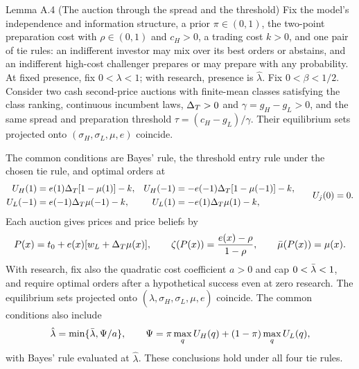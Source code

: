 \begin{paperresult}{Lemma A.4 (The auction through the spread and the threshold)}
Fix the model's independence and information structure, a prior \(\pi\in(0,1)\), the two-point preparation cost
with \(\rho\in(0,1)\) and \(c_H>0\), a trading cost \(k>0\), and one pair of tie rules: an indifferent investor may
mix over its best orders or abstains, and an indifferent high-cost challenger prepares or may prepare with any
probability. At fixed presence, fix \(0<\lambda<1\); with research, presence is \(\hat\lambda\). Fix
\(0<\beta<1/2\). Consider two cash second-price auctions with finite-mean classes satisfying the class ranking,
continuous incumbent laws, \(\Delta_T>0\) and \(\gamma=g_H-g_L>0\), and the same spread and preparation threshold
\(\tau=(c_H-g_L)/\gamma\). Their equilibrium sets projected onto \((\sigma_H,\sigma_L,\mu,e)\) coincide.

The common conditions are Bayes' rule, the threshold entry rule under the chosen tie rule, and optimal orders at
\[
\begin{aligned}
U_H(1)&=e(1)\Delta_T[1-\mu(1)]-k,& U_H(-1)&=-e(-1)\Delta_T[1-\mu(-1)]-k,\\
U_L(-1)&=e(-1)\Delta_T\mu(-1)-k,& U_L(1)&=-e(1)\Delta_T\mu(1)-k,
\end{aligned}
\qquad U_j(0)=0.
\]
Each auction gives prices and price beliefs by
\[
P(x)=t_0+e(x)[w_L+\Delta_T\mu(x)],\qquad \zeta(P(x))=\frac{e(x)-\rho}{1-\rho},\qquad \bar\mu(P(x))=\mu(x).
\]
With research, fix also the quadratic cost coefficient \(a>0\) and cap \(0<\bar\lambda<1\), and require optimal orders
after a hypothetical success even at zero research. The equilibrium sets projected onto
\((\hat\lambda,\sigma_H,\sigma_L,\mu,e)\) coincide. The common conditions also include
\[
\hat\lambda=\min\{\bar\lambda,\Psi/a\},\qquad \Psi=\pi\max_q U_H(q)+(1-\pi)\max_q U_L(q),
\]
with Bayes' rule evaluated at \(\hat\lambda\). These conclusions hold under all four tie rules.
\end{paperresult}

